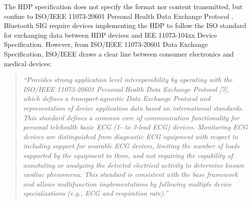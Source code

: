 The HDP specification does not specify the format nor content transmitted, but confine to ISO/IEEE 11073-20601 Personal Health Data Exchange Protocol \cite{newRef:18}. Bluetooth SIG require devices implementing the HDP to follow the ISO standard for exchanging data between HDP devices and IEE 11073-104xx Device Specification. However, from ISO/IEEE 11073-20601 Data Exchange Specification, ISO/IEEE draws a clear line between consumer electronics and medical devices: 

\begin{quote}

\textit{``Provides strong application level interoperability by operating with the ISO/IEEE 11073-20601 Personal Health Data Exchange Protocol [7], which defines a transport-agnostic Data Exchange Protocol and representation of device application data based on international standards. This standard defines a common core of communication functionality for personal telehealth basic ECG (1- to 3-lead ECG) devices. Monitoring ECG devices are distinguished from diagnostic ECG equipment with respect to including support for wearable ECG devices, limiting the number of leads supported by the equipment to three, and not requiring the capability of annotating or analyzing the detected electrical activity to determine known cardiac phenomena. This standard is consistent with the base framework and allows multifunction implementations by following multiple device specializations (e.g., ECG and respiration rate).''} \cite{newRef:18}

\end{quote}




